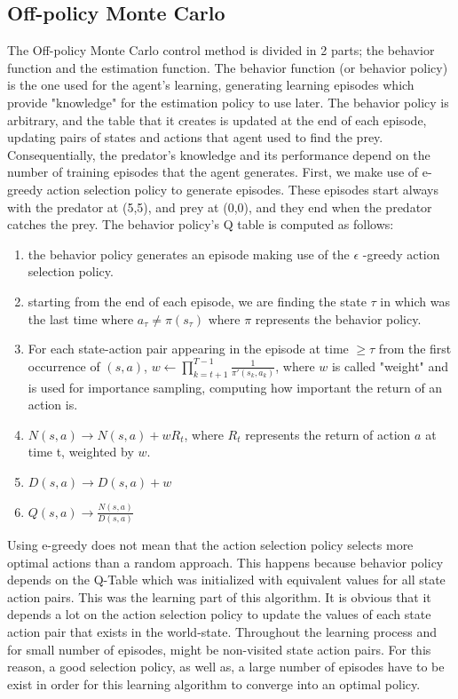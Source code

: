 \documentclass[a4paper,11pt]{article}
\begin{document}
\subsection*{Off-policy Monte Carlo}
The Off-policy Monte Carlo control method is divided in 2 parts; the behavior function and the estimation function. The behavior function (or behavior policy) is the one used for the agent's learning, generating learning episodes which provide "knowledge" for the estimation policy to use later. The behavior policy is arbitrary, and the table that it creates is updated at the end of each episode, updating pairs of states and actions that agent used to find the prey. Consequentially, the predator's knowledge and its performance depend on the number of training episodes that the agent generates. First, we make use of e-greedy action selection policy to generate episodes. These episodes start always with the predator at (5,5), and prey at (0,0), and they end when the predator catches the prey. The behavior policy's Q table is computed as follows: 
\begin{enumerate}
\item the behavior policy generates an episode making use of the $\epsilon$ -greedy action selection policy.

\item starting from the end of each episode, we are finding the state $\tau$ in which was the last time where $a_\tau \neq \pi(s_\tau)$ where $\pi$ represents the behavior policy.

\item For each state-action pair appearing in the episode at time $\geq \tau$ from the first occurrence of $(s,a)$, $w \leftarrow \prod^{T-1}_{k=t+1}\frac{1}{\pi '(s_k,a_k)}$, where $w$ is called "weight" and is used for importance sampling, computing how important the return of an action is.

\item $N(s,a) \rightarrow N(s,a) + wR_t$,  where $R_t$ represents the return of action $a$ at time t, weighted by $w$.

\item $D(s,a) \rightarrow D(s,a) + w$

\item $Q(s,a) \rightarrow \frac{N(s,a)}{D(s,a)}$
\end{enumerate}

Using e-greedy does not mean that the action selection policy selects more optimal actions than a random approach. This happens because behavior policy depends on the Q-Table  which was initialized with equivalent values for all state action pairs. This was the learning part of this algorithm. It is obvious that it depends a lot on the action selection policy to update the values of each state action pair that exists in the world-state. Throughout the learning process and for small number of episodes, might be non-visited state action pairs. For this reason, a good selection policy, as well as, a large number of episodes have to be exist in order for this learning algorithm to converge into an optimal policy.
\end{document}
